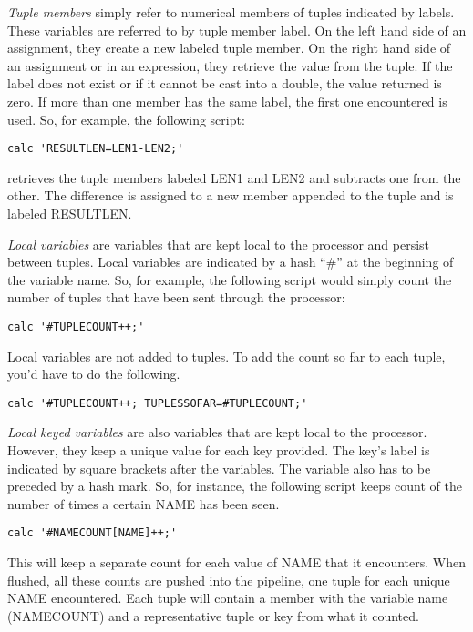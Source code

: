 \documentclass[11pt]{article}
\begin{document}
\emph{Tuple members} simply refer to numerical members of tuples indicated by labels.  These 
variables are referred to by tuple member label.  On the left hand side of an assignment,
they create a new labeled tuple member.  On the right hand side of an assignment or in
an expression, they retrieve the value from the tuple.  If the label does not exist
or if it cannot be cast into a double, the value returned is zero.  If more than one member
has the same label, the first one encountered is used. So, for example, the following
script:

\begin{lstlisting}
calc 'RESULTLEN=LEN1-LEN2;'
\end{lstlisting}

retrieves the tuple members labeled LEN1 and LEN2 and subtracts one from the other.
The difference is assigned to a new member appended to the tuple and is labeled RESULTLEN.

\emph{Local variables} are variables that are kept local to the processor and persist between
tuples.  Local variables are indicated by a hash ``\#'' at the beginning of the variable name.
 So, for example, the following script would simply count the number of tuples that
have been sent through the processor:

\begin{lstlisting}
calc '#TUPLECOUNT++;'
\end{lstlisting}

Local variables are not added to tuples.  To add the count
so far to each tuple, you'd have to do the following.

\begin{lstlisting}
calc '#TUPLECOUNT++; TUPLESSOFAR=#TUPLECOUNT;'
\end{lstlisting}

\emph{Local keyed variables} are also variables that are kept local to the processor.  However,
they keep a unique value for each key provided.  The key's label is indicated by square brackets
after the variables.  The variable also has to be preceded by a hash mark.  So, for instance, the
following script keeps count of the number of times a certain NAME has been seen.

\begin{lstlisting}
calc '#NAMECOUNT[NAME]++;'
\end{lstlisting}

This will keep a separate count for each value of NAME that it encounters.  When flushed, all
these counts are pushed into the pipeline, one tuple for each unique NAME encountered.  Each
tuple will contain a member with the variable name (NAMECOUNT) and  a representative tuple or key
from what it counted.  
\end{document}
